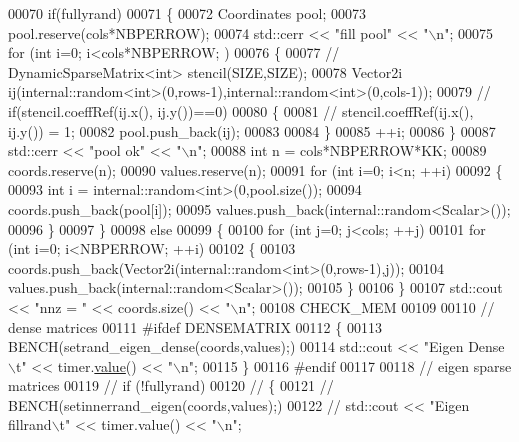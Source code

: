 \begin{DoxyCode}
00070   \textcolor{keywordflow}{if}(fullyrand)
00071   \{
00072     Coordinates pool;
00073     pool.reserve(cols*NBPERROW);
00074     std::cerr << \textcolor{stringliteral}{"fill pool"} << \textcolor{stringliteral}{"\(\backslash\)n"};
00075     \textcolor{keywordflow}{for} (\textcolor{keywordtype}{int} i=0; i<cols*NBPERROW; )
00076     \{
00077 \textcolor{comment}{//       DynamicSparseMatrix<int> stencil(SIZE,SIZE);}
00078       Vector2i ij(internal::random<int>(0,rows-1),internal::random<int>(0,cols-1));
00079 \textcolor{comment}{//       if(stencil.coeffRef(ij.x(), ij.y())==0)}
00080       \{
00081 \textcolor{comment}{//         stencil.coeffRef(ij.x(), ij.y()) = 1;}
00082         pool.push\_back(ij);
00083 
00084       \}
00085       ++i;
00086     \}
00087     std::cerr << \textcolor{stringliteral}{"pool ok"} << \textcolor{stringliteral}{"\(\backslash\)n"};
00088     \textcolor{keywordtype}{int} n = cols*NBPERROW*KK;
00089     coords.reserve(n);
00090     values.reserve(n);
00091     \textcolor{keywordflow}{for} (\textcolor{keywordtype}{int} i=0; i<n; ++i)
00092     \{
00093       \textcolor{keywordtype}{int} i = internal::random<int>(0,pool.size());
00094       coords.push\_back(pool[i]);
00095       values.push\_back(internal::random<Scalar>());
00096     \}
00097   \}
00098   \textcolor{keywordflow}{else}
00099   \{
00100     \textcolor{keywordflow}{for} (\textcolor{keywordtype}{int} j=0; j<cols; ++j)
00101     \textcolor{keywordflow}{for} (\textcolor{keywordtype}{int} i=0; i<NBPERROW; ++i)
00102     \{
00103       coords.push\_back(Vector2i(internal::random<int>(0,rows-1),j));
00104       values.push\_back(internal::random<Scalar>());
00105     \}
00106   \}
00107   std::cout << \textcolor{stringliteral}{"nnz = "} << coords.size()  << \textcolor{stringliteral}{"\(\backslash\)n"};
00108   CHECK\_MEM
00109 
00110     \textcolor{comment}{// dense matrices}
00111 \textcolor{preprocessor}{    #ifdef DENSEMATRIX}
00112     \{
00113       BENCH(setrand\_eigen\_dense(coords,values);)
00114       std::cout << \textcolor{stringliteral}{"Eigen Dense\(\backslash\)t"} << timer.\hyperlink{class_eigen_1_1_bench_timer_a26760f963ed8b64c126159bfea57735e}{value}() << \textcolor{stringliteral}{"\(\backslash\)n"};
00115     \}
00116 \textcolor{preprocessor}{    #endif}
00117 
00118     \textcolor{comment}{// eigen sparse matrices}
00119 \textcolor{comment}{//     if (!fullyrand)}
00120 \textcolor{comment}{//     \{}
00121 \textcolor{comment}{//       BENCH(setinnerrand\_eigen(coords,values);)}
00122 \textcolor{comment}{//       std::cout << "Eigen fillrand\(\backslash\)t" << timer.value() << "\(\backslash\)n";}

\end{DoxyCode}

